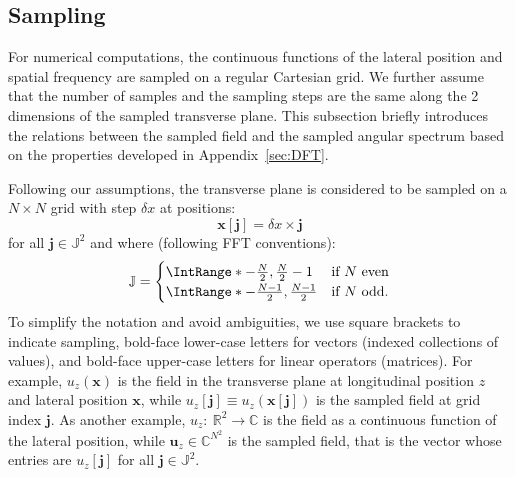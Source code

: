 \documentclass[a4paper]{article}
\newcommand{\V}[1]{\boldsymbol{#1}}
\newcommand*{\from}{{:}\:}
\newcommand*{\Set}[1]{\mathbb{#1}}
\begin{document}
\subsection{Sampling}

For numerical computations, the continuous functions of the lateral position
and spatial frequency are sampled on a regular Cartesian grid. We further
assume that the number of samples and the sampling steps are the same along the
2 dimensions of the sampled transverse plane. This subsection briefly
introduces the relations between the sampled field and the sampled angular
spectrum based on the properties developed in Appendix~\ref{sec:DFT}.

Following our assumptions, the transverse plane is considered to be sampled on
a $N\times N$ grid with step $δx$ at positions:
\begin{equation}
  \label{eq:x[j]}
  \V{x}[\V{j}] = δx\times\V{j}
\end{equation}
for all $\V{j} \in \Set{J}^{2}$ and where (following FFT conventions):
\begin{equation}
  \label{eq:J}
  \Set{J} =
  \begin{cases}
    \IntRange*{-\tfrac{N}{2},\tfrac{N}{2}-1}
    & \text{if $N$ even}\\
    \IntRange*{-\tfrac{N-1}{2},\tfrac{N-1}{2}}
    & \text{if $N$ odd.}\\
  \end{cases}
\end{equation}
To simplify the notation and avoid ambiguities, we use square brackets to
indicate sampling, bold-face lower-case letters for vectors (indexed
collections of values), and bold-face upper-case letters for linear operators
(matrices). For example, $u_{z}(\V{x})$ is the field in the transverse plane at
longitudinal position $z$ and lateral position $\V{x}$, while
$u_{z}[\V{j}] \equiv u_{z}(\V{x}[\V{j}])$ is the sampled field at grid index
$\V{j}$. As another example, $u_{z}\from\Set{R}^{2}\to\Set{C}$ is the field as
a continuous function of the lateral position, while
$\V{u}_{z} \in \Set{C}^{N^{2}}$ is the sampled field, that is the vector whose
entries are $u_{z}[\V{j}]$ for all $\V{j} \in \Set{J}^{2}$.
\end{document}
